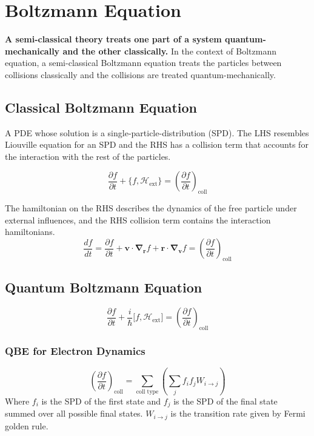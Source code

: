 \newpage
\section{Boltzmann Equation}
\label{app:boltzmann_equation}

\textbf{A semi-classical theory treats one part of a system quantum-mechanically and the other classically.} In the context of Boltzmann equation, a semi-classical Boltzmann equation treats the particles between collisions classically and the collisions are treated quantum-mechanically.

\subsection{Classical Boltzmann Equation}
A PDE whose solution is a single-particle-distribution (SPD). The LHS resembles Liouville equation for an SPD and the RHS has a collision term that accounts for the interaction with the rest of the particles.

\begin{equation}
\frac{ \partial f }{ \partial t } + \Big\{ f, \mathcal{H}_{\text{ext}} \Big\} = \left( \frac{ \partial f }{ \partial t }  \right)_{\text{coll}}
\label{eq:classical_boltzmann}
\end{equation}

The hamiltonian on the RHS describes the dynamics of the free particle under external influences, and the RHS collision term contains the interaction hamiltonians.
\begin{equation}
\frac{df}{dt} = \frac{ \partial f }{ \partial t } + \mathbf{v}\cdot\boldsymbol{\nabla_{r}}f + \mathbf{r}\cdot\boldsymbol{\nabla_{v}}f = \left( \frac{ \partial f }{ \partial t }  \right)_{\text{coll}} 
\label{eq:classical_boltzmann_total_derivative}
\end{equation}

\subsection{Quantum Boltzmann Equation}
\begin{equation}
\frac{ \partial f }{ \partial t } + \frac{i}{\hbar}\Big[ f, \mathcal{H}_{\text{ext}} \Big] = \left( \frac{ \partial f }{ \partial t }  \right)_{\text{coll}}
\label{eq:quantum_boltzmann}
\end{equation}
\subsubsection{QBE for Electron Dynamics}
\begin{equation}
\left( \frac{ \partial f }{ \partial t } \right)_{\text{coll}} = \sum\limits_{\text{coll type}} \left( \sum\limits_{j} f_{i}f_{j}W_{i\to j}  \right)
\label{eq:qbe_collision_term}
\end{equation}
Where $f_{i}$ is the SPD of the first state and $f_{j}$ is the SPD of the final state summed over all possible final states. $W_{i\to j}$ is the transition rate given by Fermi golden rule.

